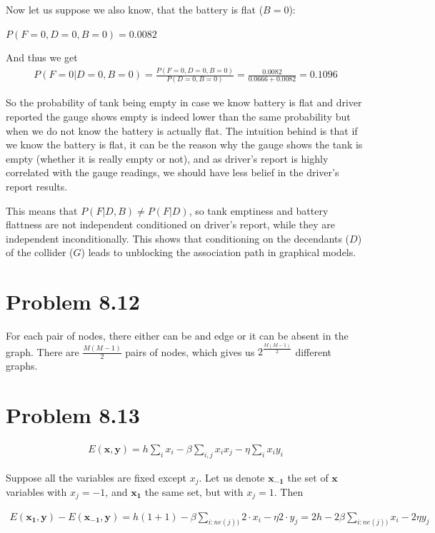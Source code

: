 \documentclass[fleqn]{article}
\begin{document}
Now let us suppose we also know, that the battery is flat ($B = 0$):

$P(F = 0,D = 0,B =0) = 0.0082$

And thus we get
\begin{align}
P(F = 0|D=0,B=0) =  \frac{P(F = 0, D = 0, B=0)}{P(D=0,B=0)} = \frac{0.0082}{0.0666 + 0.0082} = 0.1096
\end{align}

So the probability of tank being empty in case we know battery is flat and driver reported the gauge shows empty is indeed lower than the same probability but when we do not know the battery is actually flat. The intuition behind is that if we know the battery is flat, it can be the reason why the gauge shows the tank is empty (whether it is really empty or not), and as driver's report is highly correlated with the gauge readings, we should have less belief in the driver's report results. 

This means that $P(F|D,B) \ne P(F|D)$, so tank emptiness and battery flattness are not independent conditioned on driver's report, while they are independent inconditionally. This shows that conditioning on the decendants ($D$) of the collider ($G$) leads to unblocking the association path in graphical models.

\section*{Problem 8.12}

For each pair of nodes, there either can be and edge or it can be absent in the graph. There are $\frac{M(M-1)}{2}$ pairs of nodes, which gives us $2^\frac{M(M-1)}{2}$ different graphs.

\section*{Problem 8.13}

\begin{align}
	\label{eqn:icm_energy}
	E(\boldsymbol{x},\boldsymbol{y}) = h\sum\limits_{i} x_i - \beta \sum\limits_{i,j } x_ix_j - \eta \sum\limits_{i} x_iy_i
\end{align}

Suppose all the variables are fixed except $x_j$. Let us denote $\boldsymbol{x_{-1}}$ the set of $\boldsymbol{x}$ variables with $x_j = -1$, and $\boldsymbol{x_1}$ the same set, but with $x_j = 1$. Then 

\begin{align}
	E(\boldsymbol{x_1},\boldsymbol{y}) - E(\boldsymbol{x_{-1}},\boldsymbol{y}) = h (1 + 1) - \beta \sum\limits_{i : ne(j)) } 2\cdot x_i - \eta 2 \cdot y_j = 2h - 2\beta \sum\limits_{i : ne(j)) } x_i - 2\eta y_j
\end{align}
\end{document}
